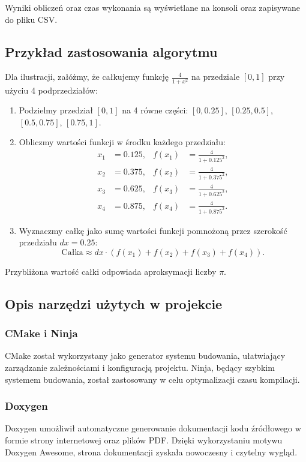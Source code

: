 Wyniki obliczeń oraz czas wykonania są wyświetlane na konsoli oraz zapisywane do pliku CSV.

\subsection{Przykład zastosowania algorytmu}
Dla ilustracji, załóżmy, że całkujemy funkcję $\frac{4}{1+x^2}$ na przedziale $[0, 1]$ przy użyciu 4 podprzedziałów:
\begin{enumerate}
  \item Podzielmy przedział $[0, 1]$ na 4 równe części: $[0, 0.25]$, $[0.25, 0.5]$, $[0.5, 0.75]$, $[0.75, 1]$.
  \item Obliczmy wartości funkcji w środku każdego przedziału:
        \begin{align*}
          x_1 & = 0.125, & f(x_1) & = \frac{4}{1 + 0.125^2}, \\
          x_2 & = 0.375, & f(x_2) & = \frac{4}{1 + 0.375^2}, \\
          x_3 & = 0.625, & f(x_3) & = \frac{4}{1 + 0.625^2}, \\
          x_4 & = 0.875, & f(x_4) & = \frac{4}{1 + 0.875^2}.
        \end{align*}
  \item Wyznaczmy całkę jako sumę wartości funkcji pomnożoną przez szerokość przedziału $dx = 0.25$:
        \[
          \text{Całka} \approx dx \cdot \left(f(x_1) + f(x_2) + f(x_3) + f(x_4)\right).
        \]
\end{enumerate}
Przybliżona wartość całki odpowiada aproksymacji liczby $\pi$.

\subsection{Opis narzędzi użytych w projekcie}
\subsubsection{CMake i Ninja}
CMake został wykorzystany jako generator systemu budowania, ułatwiający zarządzanie zależnościami i konfiguracją projektu. Ninja, będący szybkim systemem budowania, został zastosowany w celu optymalizacji czasu kompilacji.

\subsubsection{Doxygen}
Doxygen umożliwił automatyczne generowanie dokumentacji kodu źródłowego w formie strony internetowej oraz plików PDF. Dzięki wykorzystaniu motywu Doxygen Awesome, strona dokumentacji zyskała nowoczesny i czytelny wygląd.


